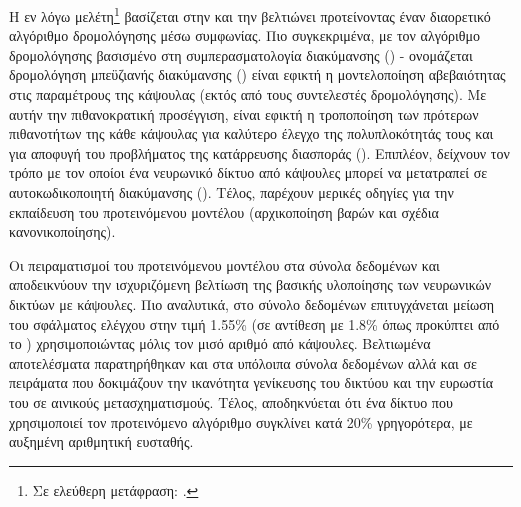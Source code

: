 Η εν λόγω μελέτη\footnote{Σε ελεύθερη μετάφραση: .}\cite{De_Sousa_Ribeiro_Leontidis_Kollias_2020_Capsule_Routing} βασίζεται στην \cite{hinton2018matrix} και την βελτιώνει προτείνοντας έναν διαορετικό αλγόριθμο δρομολόγησης μέσω συμφωνίας. Πιο συγκεκριμένα, με τον αλγόριθμο δρομολόγησης βασισμένο στη συμπερασματολογία διακύμανσης () - ονομάζεται δρομολόγηση μπεϋζιανής διακύμανσης () είναι εφικτή η μοντελοποίηση αβεβαιότητας στις παραμέτρους της κάψουλας (εκτός από τους συντελεστές δρομολόγησης). Με αυτήν την πιθανοκρατική προσέγγιση, είναι εφικτή η τροποποίηση των πρότερων πιθανοτήτων της κάθε κάψουλας για καλύτερο έλεγχο της πολυπλοκότητάς τους και για αποφυγή του προβλήματος της κατάρρευσης διασποράς (). Επιπλέον, δείχνουν τον τρόπο με τον οποίοι ένα νευρωνικό δίκτυο από κάψουλες μπορεί να μετατραπεί σε αυτο\textendash κωδικοποιητή διακύμανσης (). Τέλος, παρέχουν μερικές οδηγίες για την εκπαίδευση του προτεινόμενου μοντέλου (αρχικοποίηση βαρών και σχέδια κανονικοποίησης). \par

Οι πειραματισμοί του προτεινόμενου μοντέλου στα σύνολα δεδομένων  και  αποδεικνύουν την ισχυριζόμενη βελτίωση της βασικής υλοποίησης των νευρωνικών δικτύων με κάψουλες. Πιο αναλυτικά, στο σύνολο δεδομένων \cite{lecun2004learning} επιτυγχάνεται μείωση του σφάλματος ελέγχου στην τιμή 1.55\% (σε αντίθεση με 1.8\% όπως προκύπτει από το \cite{hinton2018matrix}) χρησιμοποιώντας μόλις τον μισό αριθμό από κάψουλες. Βελτιωμένα αποτελέσματα παρατηρήθηκαν και στα υπόλοιπα σύνολα δεδομένων αλλά και σε πειράματα που δοκιμάζουν την ικανότητα γενίκευσης του δικτύου και την ευρωστία του σε αινικούς μετασχηματισμούς. Τέλος, αποδηκνύεται ότι ένα δίκτυο που χρησιμοποιεί τον προτεινόμενο αλγόριθμο συγκλίνει κατά 20\% γρηγορότερα, με αυξημένη αριθμητική ευσταθής.

